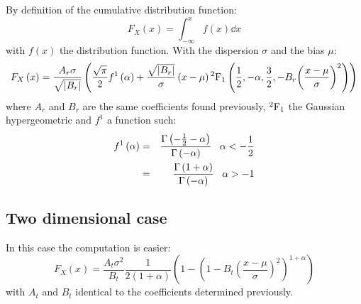 By definition of the cumulative distribution function:
%
\begin{equation}
    F_X\left(x\right)=\int_{-\infty}^x f\left(x\right)\dd x
\end{equation}
%
with $f\left(x\right)$ the distribution function. With the dispersion
$\sigma$ and the bias $\mu$:
%
\begin{equation}
    F_X\left(x\right)=
    \frac{A_r\sigma}{\sqrt{\left|B_r\right|}}
    \left(
        \frac{\sqrt\pi}{2} f^1\left(\alpha\right)+
        \frac{\sqrt{\left|B_r\right|}}{\sigma}\left(x-\mu\right)
        {^2{\rm{F}}_1\left(\frac{1}{2},-\alpha,\frac{3}{2},-B_r{\left(\frac{x-\mu}{\sigma}\right)}^2\right)}\right)
\end{equation}
%
where $A_r$ and $B_r$ are the same coefficients found previously,
${^2{\rm{F}}_1}$ the Gaussian hypergeometric and $f^1$ a function such:
%
\begin{eqnarray}
    f^1\left(\alpha\right)&=&
        \frac{\Gamma\left(-\frac{1}{2}-\alpha\right)}{\Gamma\left(-\alpha\right)}
        \;\;\;\alpha<-\frac{1}{2}\\\nonumber
    &=&\frac{\Gamma\left(1+\alpha\right)}{\Gamma\left(-\alpha\right)}
        \;\;\;\alpha>-1\\
\end{eqnarray}

\subsection{Two dimensional case}
\label{sub:cdf_two_dimensions_case}

In this case the computation is easier:
%
\begin{equation}
    F_X\left(x\right)=
        \frac{A_t\sigma^2}{B_t}
        \frac{1}{2\left(1+\alpha\right)}
            \left(1-{\left(
                1-B_t{\left(\frac{x-\mu}{\sigma}\right)}^2
            \right)}^{1+\alpha}\right)
\end{equation}
%
with $A_t$ and $B_t$ identical to the coefficients determined previously.

